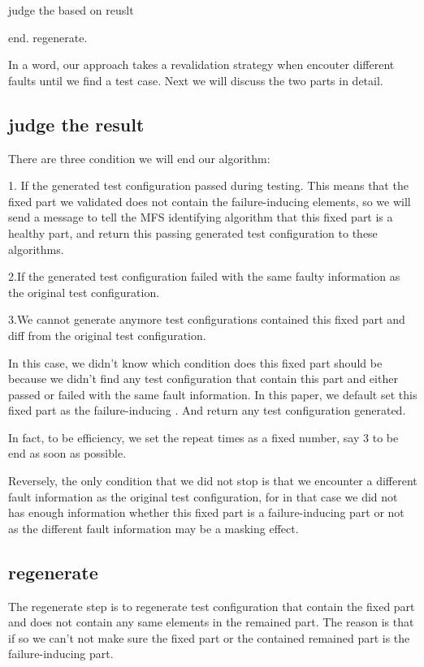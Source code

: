 \documentclass{sig-alternate}
\begin{document}
judge the based on reuslt

end. regenerate.

In a word, our approach takes a revalidation strategy when encouter different faults until we find a test case. Next we will discuss the two parts in detail.

\subsection{judge the result}
There are three condition we will end our algorithm:

1. If the generated test configuration passed during testing. This means that the fixed part we validated does not contain the failure-inducing elements, so we will send a message to tell the MFS identifying algorithm that this fixed part is a healthy part, and return this passing generated test configuration to these algorithms.

2.If the generated test configuration failed with the same faulty information as the original test configuration.


3.We cannot generate anymore test configurations contained this fixed part and diff from the original test configuration.

In this case, we didn't know which condition does this fixed part should be because we didn't find any test configuration that contain this part and either passed or failed with the same fault information. In this paper, we default set this fixed part as the failure-inducing . And return any test configuration generated.

In fact, to be efficiency, we set the repeat times as a fixed number, say 3 to be end as soon as possible.

Reversely, the only condition that we did not stop is that we encounter a different fault information as the original test configuration, for in that case we did not has enough information whether this fixed part is a failure-inducing part or not as the different fault information may be a masking effect.

\subsection{regenerate}
The regenerate step is to regenerate test configuration that contain the fixed part and does not contain any same elements in the remained part. The reason is that if so we can't not make sure the fixed part or the contained remained part is the failure-inducing part.
\end{document}
